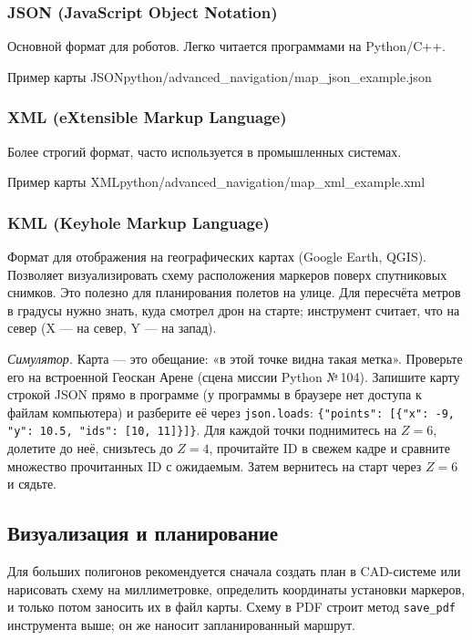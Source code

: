 \subsubsection{JSON (JavaScript Object Notation)}
Основной формат для роботов. Легко читается программами на Python/C++.
\begin{codefiletitle}[python]{Пример карты JSON}{python/advanced_navigation/map_json_example.json}
\end{codefiletitle}

\subsubsection{XML (eXtensible Markup Language)}
Более строгий формат, часто используется в промышленных системах.
\begin{codefiletitle}[xml]{Пример карты XML}{python/advanced_navigation/map_xml_example.xml}
\end{codefiletitle}

\subsubsection{KML (Keyhole Markup Language)}
Формат для отображения на географических картах (Google Earth, QGIS). Позволяет визуализировать схему расположения маркеров поверх спутниковых снимков. Это полезно для планирования полетов на улице. Для пересчёта метров в градусы нужно знать, куда смотрел дрон на старте; инструмент считает, что на север (X --- на север, Y --- на запад).

\begin{taskbox}
\emph{Симулятор.} Карта --- это обещание: «в этой точке видна такая метка». Проверьте его на встроенной Геоскан Арене (сцена миссии Python №\,104). Запишите карту строкой JSON прямо в программе (у программы в браузере нет доступа к файлам компьютера) и разберите её через \verb|json.loads|:
\verb|{"points": [{"x": -9, "y": 10.5, "ids": [10, 11]}]}|.
Для каждой точки поднимитесь на $Z = 6$, долетите до неё, снизьтесь до $Z = 4$, прочитайте ID в свежем кадре и сравните множество прочитанных ID с ожидаемым. Затем вернитесь на старт через $Z = 6$ и сядьте.
\end{taskbox}

\subsection{Визуализация и планирование}
Для больших полигонов рекомендуется сначала создать план в CAD-системе или нарисовать схему на миллиметровке, определить координаты установки маркеров, и только потом заносить их в файл карты. Схему в PDF строит метод \verb|save_pdf| инструмента выше; он же наносит запланированный маршрут.

